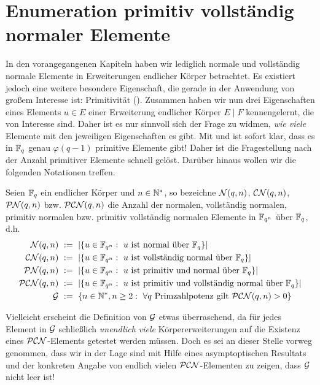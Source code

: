 \chapter{Enumeration primitiv vollständig normaler Elemente}

In den vorangegangenen Kapiteln haben wir lediglich normale und vollständig
normale Elemente in Erweiterungen endlicher Körper betrachtet. Es existiert
jedoch eine weitere besondere Eigenschaft, die gerade in der Anwendung von
großem Interesse ist: Primitivität (). Zusammen haben wir
nun drei Eigenschaften eines Elements $u \in E$ einer Erweiterung endlicher
Körper $E\mid F$ kennengelernt, die von Interesse sind. Daher ist es nur
sinnvoll sich der Frage zu widmen, \emph{wie viele} Elemente mit den jeweiligen
Eigenschaften es gibt. Mit  und 
 ist sofort klar, dass es in
$\F_q$ genau $\varphi(q-1)$ primitive Elemente gibt! Daher ist die
Fragestellung nach der Anzahl primitiver Elemente schnell gelöst. Darüber
hinaus wollen wir die folgenden Notationen treffen.

\begin{definition}
  Seien $\F_q$ ein endlicher Körper und $n \in \N^\ast$, so bezeichne
  $\cal N(q,n)$, $\CN(q,n)$, $\PN(q,n)$ bzw. $\PCN(q,n)$ die Anzahl der 
  normalen, vollständig normalen, primitiv normalen bzw. primitiv vollständig
  normalen Elemente in $\F_{q^n}$ über $\F_q$, d.h.
  \begin{align*}
    \cal N(q,n) &\speq{:=} 
      |\{ u \in \F_{q^n}:\ u\text{ ist normal über }\F_q\}| \\
    \CN(q,n) &\speq{:=} 
      |\{ u \in \F_{q^n}:\ u\text{ ist vollständig normal über }\F_q\}| \\
    \PN(q,n) &\speq{:=} 
      |\{ u \in \F_{q^n}:\ u\text{ ist primitiv und normal über }\F_q\}| \\
    \PCN(q,n) &\speq{:=} 
      |\{ u \in \F_{q^n}:\ u\text{ ist primitiv und vollständig 
      normal über }\F_q\}| \\
    \G &\speq{:=} 
      \{ n\in \N^\ast, n\geq 2:\ 
      \forall q\text{ Primzahlpotenz gilt } \PCN(q,n) > 0 \}
  \end{align*}
\end{definition}

Vielleicht erscheint die Definition von $\G$ etwas überraschend, da für jedes
Element in $\G$ schließlich \emph{unendlich viele} Körpererweiterungen auf die
Existenz eines $\PCN$-Elements getestet werden müssen. Doch es sei an dieser
Stelle vorweg genommen, dass wir in der Lage sind mit Hilfe eines
asymptoptischen Resultats und der konkreten Angabe von endlich vielen
$\PCN$-Elementen zu zeigen, dass $\G$ nicht leer ist!

